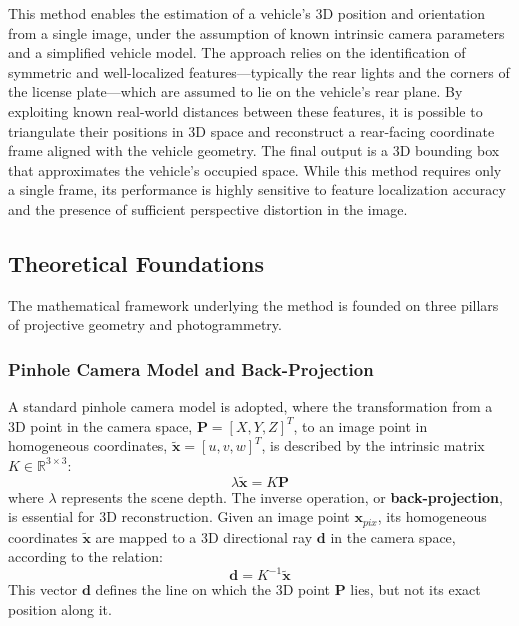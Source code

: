 This method enables the estimation of a vehicle’s 3D position and orientation from a single image, under the assumption of known intrinsic camera parameters and a simplified vehicle model. The approach relies on the identification of symmetric and well-localized features—typically the rear lights and the corners of the license plate—which are assumed to lie on the vehicle's rear plane. By exploiting known real-world distances between these features, it is possible to triangulate their positions in 3D space and reconstruct a rear-facing coordinate frame aligned with the vehicle geometry. The final output is a 3D bounding box that approximates the vehicle's occupied space. While this method requires only a single frame, its performance is highly sensitive to feature localization accuracy and the presence of sufficient perspective distortion in the image.

\subsection{Theoretical Foundations}
The mathematical framework underlying the method is founded on three pillars of projective geometry and photogrammetry.

\subsubsection{Pinhole Camera Model and Back-Projection}
A standard pinhole camera model is adopted, where the transformation from a 3D point in the camera space, $\mathbf{P} = [X, Y, Z]^T$, to an image point in homogeneous coordinates, $\tilde{\mathbf{x}} = [u, v, w]^T$, is described by the intrinsic matrix $K \in \mathbb{R}^{3 \times 3}$:
\[
\lambda \tilde{\mathbf{x}} = K \mathbf{P}
\]
where $\lambda$ represents the scene depth. The inverse operation, or \textbf{back-projection}, is essential for 3D reconstruction. Given an image point $\mathbf{x}_{pix}$, its homogeneous coordinates $\tilde{\mathbf{x}}$ are mapped to a 3D directional ray $\mathbf{d}$ in the camera space, according to the relation:
\[
\mathbf{d} = K^{-1} \tilde{\mathbf{x}}
\]
This vector $\mathbf{d}$ defines the line on which the 3D point $\mathbf{P}$ lies, but not its exact position along it.

